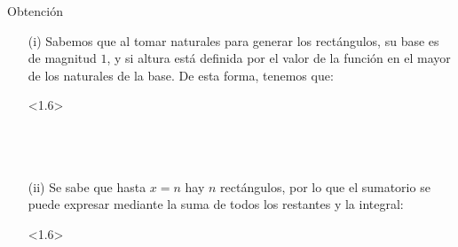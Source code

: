
\begin{proofbox}{Obtención}
    \begin{itemize}
        \item[(i)] Sabemos que al tomar naturales para generar los rectángulos, su base es de magnitud $1$, y si altura está definida por el valor de la función en el mayor de los naturales de la base. De esta forma, tenemos que:
        \begin{center}
            \begin{derivation}<1.6>
                    \\
                \\
                    \\
                \why*{}\\
            \end{derivation}
        \end{center}
        \item[(ii)] Se sabe que hasta $x=n$ hay $n$ rectángulos, por lo que el sumatorio se puede expresar mediante la suma de todos los restantes y la integral:
        \begin{center}
            \begin{derivation}<1.6>
                    \\
                \why*{}\\
            \end{derivation}
        \end{center}
    \end{itemize}
\end{proofbox}